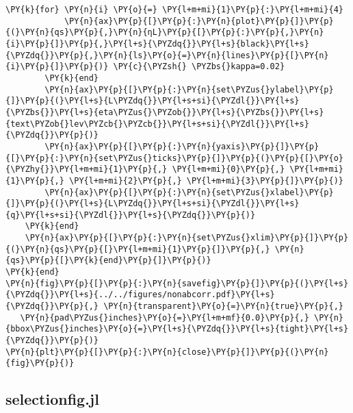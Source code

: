 \begin{Verbatim}[commandchars=\\\{\}]
        \PY{k}{for} \PY{n}{i} \PY{o}{=} \PY{l+m+mi}{1}\PY{p}{:}\PY{l+m+mi}{4}
            \PY{n}{ax}\PY{p}{[}\PY{p}{:}\PY{n}{plot}\PY{p}{]}\PY{p}{(}\PY{n}{qs}\PY{p}{,}\PY{n}{ηL}\PY{p}{[}\PY{p}{:}\PY{p}{,}\PY{n}{i}\PY{p}{]}\PY{p}{,}\PY{l+s}{\PYZdq{}}\PY{l+s}{black}\PY{l+s}{\PYZdq{}}\PY{p}{,}\PY{n}{ls}\PY{o}{=}\PY{n}{lines}\PY{p}{[}\PY{n}{i}\PY{p}{]}\PY{p}{)} \PY{c}{\PYZsh{} \PYZbs{}kappa=0.02}
        \PY{k}{end}
        \PY{n}{ax}\PY{p}{[}\PY{p}{:}\PY{n}{set\PYZus{}ylabel}\PY{p}{]}\PY{p}{(}\PY{l+s}{L\PYZdq{}}\PY{l+s+si}{\PYZdl{}}\PY{l+s}{\PYZbs{}}\PY{l+s}{eta\PYZus{}\PYZob{}}\PY{l+s}{\PYZbs{}}\PY{l+s}{text\PYZob{}lev\PYZcb{}\PYZcb{}}\PY{l+s+si}{\PYZdl{}}\PY{l+s}{\PYZdq{}}\PY{p}{)}
        \PY{n}{ax}\PY{p}{[}\PY{p}{:}\PY{n}{yaxis}\PY{p}{]}\PY{p}{[}\PY{p}{:}\PY{n}{set\PYZus{}ticks}\PY{p}{]}\PY{p}{(}\PY{p}{[}\PY{o}{\PYZhy{}}\PY{l+m+mi}{1}\PY{p}{,} \PY{l+m+mi}{0}\PY{p}{,} \PY{l+m+mi}{1}\PY{p}{,} \PY{l+m+mi}{2}\PY{p}{,} \PY{l+m+mi}{3}\PY{p}{]}\PY{p}{)}
        \PY{n}{ax}\PY{p}{[}\PY{p}{:}\PY{n}{set\PYZus{}xlabel}\PY{p}{]}\PY{p}{(}\PY{l+s}{L\PYZdq{}}\PY{l+s+si}{\PYZdl{}}\PY{l+s}{q}\PY{l+s+si}{\PYZdl{}}\PY{l+s}{\PYZdq{}}\PY{p}{)}
    \PY{k}{end}
    \PY{n}{ax}\PY{p}{[}\PY{p}{:}\PY{n}{set\PYZus{}xlim}\PY{p}{]}\PY{p}{(}\PY{n}{qs}\PY{p}{[}\PY{l+m+mi}{1}\PY{p}{]}\PY{p}{,} \PY{n}{qs}\PY{p}{[}\PY{k}{end}\PY{p}{]}\PY{p}{)}
\PY{k}{end}
\PY{n}{fig}\PY{p}{[}\PY{p}{:}\PY{n}{savefig}\PY{p}{]}\PY{p}{(}\PY{l+s}{\PYZdq{}}\PY{l+s}{../../figures/nonabcorr.pdf}\PY{l+s}{\PYZdq{}}\PY{p}{,} \PY{n}{transparent}\PY{o}{=}\PY{n}{true}\PY{p}{,}
   \PY{n}{pad\PYZus{}inches}\PY{o}{=}\PY{l+m+mf}{0.0}\PY{p}{,} \PY{n}{bbox\PYZus{}inches}\PY{o}{=}\PY{l+s}{\PYZdq{}}\PY{l+s}{tight}\PY{l+s}{\PYZdq{}}\PY{p}{)}
\PY{n}{plt}\PY{p}{[}\PY{p}{:}\PY{n}{close}\PY{p}{]}\PY{p}{(}\PY{n}{fig}\PY{p}{)}
\end{Verbatim}


\subsection{selection\textunderscore fig.jl}\label{subsec:selection}

